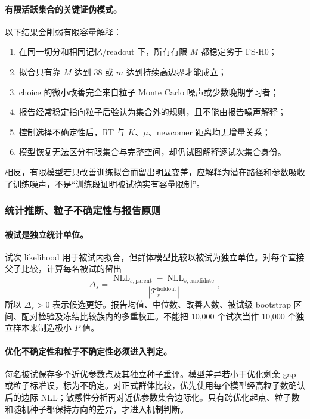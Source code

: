 \paragraph{有限活跃集合的关键证伪模式。}
以下结果会削弱有限容量解释：
\begin{enumerate}
    \item 在同一切分和相同记忆/readout 下，所有有限 $M$ 都稳定劣于 FS-H0；
    \item 拟合只有靠 $M$ 达到 38 或 $m$ 达到持续高边界才能成立；
    \item choice 的微小改善完全来自粒子 Monte Carlo 噪声或少数晚期学习者；
    \item 报告经常稳定指向粒子后验认为集合外的规则，且不能由报告噪声解释；
    \item 控制选择不确定性后，RT 与 $K$、$\mu$、newcomer 距离均无增量关系；
    \item 模型恢复无法区分有限集合与完整空间，却仍试图解释逐试次集合身份。
\end{enumerate}
相反，有限模型若只改善训练拟合而留出明显变差，应解释为潜在路径和参数吸收了训练噪声，不是“训练段证明被试确实有容量限制”。


\subsubsection{统计推断、粒子不确定性与报告原则}

\paragraph{被试是独立统计单位。}
试次 likelihood 用于被试内拟合，但群体模型比较以被试为独立单位。对每个直接父子比较，计算每名被试的留出
\begin{equation}
    \Delta_{s}
    =\frac{\operatorname{NLL}_{s,\mathrm{parent}}
      -\operatorname{NLL}_{s,\mathrm{candidate}}}
      {|\mathcal T^{\mathrm{holdout}}_s|},
    \label{eq:model0804-subject-delta}
\end{equation}
所以 $\Delta_s>0$ 表示候选更好。报告均值、中位数、改善人数、被试级 bootstrap 区间、配对检验及冻结比较族内的多重校正。不能把 10,000 个试次当作 10,000 个独立样本来制造极小 $P$ 值。

\paragraph{优化不确定性和粒子不确定性必须进入判定。}
每名被试保存多个近优参数点及其独立种子重评。模型差异若小于优化剩余 gap 或粒子标准误，标为不确定。对正式群体比较，优先使用每个模型经高粒子数确认后的边际 NLL；敏感性分析再对近优参数集合边际化。只有跨优化起点、粒子数和随机种子都保持方向的差异，才进入机制判断。

